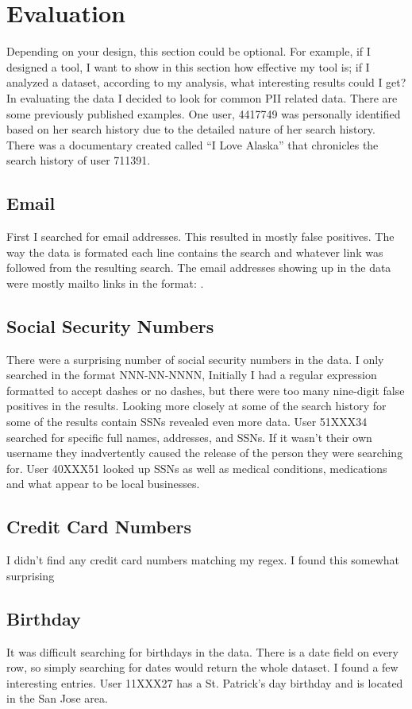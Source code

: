 \documentclass{article}
\begin{document}
\section{Evaluation}
Depending on your design, this section could be optional. For example, if I designed a tool, I want to show in this section how effective my tool is; if I analyzed a dataset, according to my analysis, what interesting results could I get?\\

In evaluating the data I decided to look for common PII related data. There are some previously published examples. One user, 4417749 was personally identified based on her search history due to the detailed nature of her search history\cite{nyt}. There was a documentary created called “I Love Alaska” that chronicles the search history of user 711391\cite{imdb}.
\subsection{Email}
First I searched for email addresses. This resulted in mostly false positives. The way the data is formated each line contains the search and whatever link was followed from the resulting search. The email addresses showing up in the data were mostly mailto links in the format: .
\subsection{Social Security Numbers}
There were a surprising number of social security numbers in the data. I only searched in the format NNN-NN-NNNN, Initially I had a regular expression formatted to accept dashes or no dashes, but there were too many nine-digit false positives in the results. Looking more closely at some of the search history for some of the results contain SSNs revealed even more data. User 51XXX34 searched for  specific full names, addresses, and SSNs. If it wasn’t their own username they inadvertently caused the release of the person they were searching for. User 40XXX51 looked up SSNs as well as medical conditions, medications and what appear to be local businesses.
\subsection{Credit Card Numbers}
I didn’t find any credit card numbers matching my regex. I found this somewhat surprising
\subsection{Birthday}
It was difficult searching for birthdays in the data. There is a date field on every row, so simply searching for dates would return the whole dataset. I found a few interesting entries. User 11XXX27 has a St. Patrick’s day birthday and is located in the San Jose area.
\end{document}
